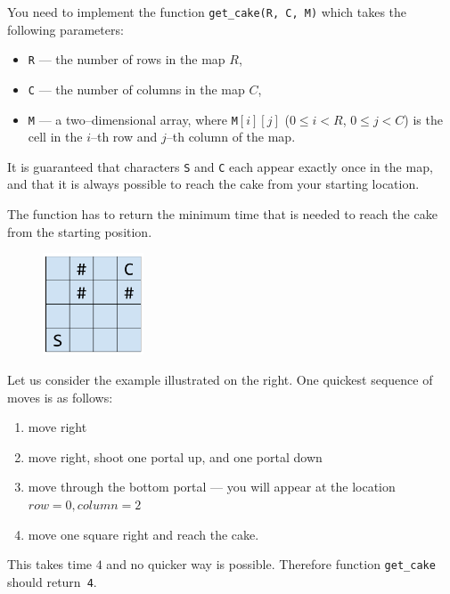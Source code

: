 \documentclass{../../../latex/boi2014-lt}
\newcommand{\param}[1]{{\tt #1}}
\newcommand{\method}[1]{{\tt #1}}
\newcommand{\constant}[1]{{\tt #1}}
\begin{document}
    \Implementation
    You need to implement the function \method{get\_cake(R, C, M)}
    which takes the following parameters:
    \begin{itemize}
        \item \param{R} --- the number of rows in the map $R$,
        \item \param{C} --- the number of columns in the map $C$,
        \item \param{M} --- a two--dimensional array, where
            \param{M}$[i][j]$ ($0 \le i < R$, $0 \le j < C$) is the cell in
             the $i$--th row and $j$--th column of the map.
    \end{itemize}

    It is guaranteed that characters \constant{S} and \constant{C} each appear
    exactly once in the map, and that it is always possible to reach the cake
    from your starting location.

    The function has to return the minimum time that is needed to reach the cake
    from the starting position.

    \Example
    \begin{figure}
        \includegraphics[width=3cm]{fig-example}
    \end{figure}
    Let us consider the example illustrated on the right.
    One quickest sequence of moves is as follows:

    \begin{enumerate}
        \item move right
        \item move right, shoot one portal up, and one portal down
        \item move through the bottom portal --- you will appear at 
            the location $row = 0, column = 2$
        \item move one square right and reach the cake.
    \end{enumerate}

    This takes time $4$ and no quicker way is possible. Therefore
    function \method{get\_cake} should return~\constant{4}.

    \Scoring
\end{document}
